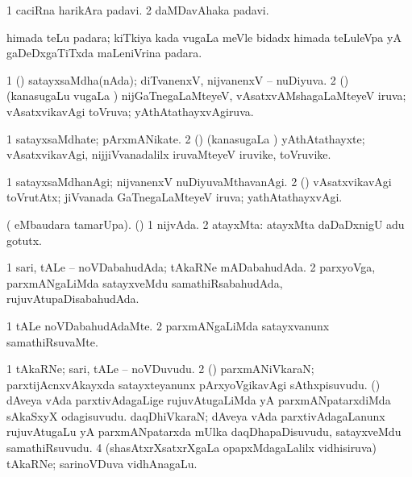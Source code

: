 {{\bentry
{} 
\gl{\nA}
\expl{}
\bmng
\bnum
\num{1} caciRna harikAra padavi. 
\num{2} daMDavAhaka padavi. 
\enum
\emng
\eentry

\bentry
{} 
\gl{\nA}
\expl{}
\bmng
 himada teLu padara; kiTkiya kada \mo vugaLa meVle bidadx himada teLuleVpa yA gaDeDxgaTiTxda maLeniVrina padara. 
\emng
\eentry

\bentry
{} 
\gl{\gu}
\expl{}
\bmng
\bnum
\num{1} (\aupa) satayxsaMdha(nAda); diTvanenxV, nijvanenxV -- nuDiyuva. 
\num{2} (\mashA) (kanasugaLu \mo vugaLa \vi) nijGaTnegaLaMteyeV, vAsatxvAMshagaLaMteyeV iruva; vAsatxvikavAgi toVruva; yAthAtathayxvAgiruva. 
\enum
\emng
\eentry

\bentry
{} 
\gl{\nA}
\expl{}
\bmng
\bnum
\num{1} satayxsaMdhate; pArxmANikate. 
\num{2} (\mashA) (kanasugaLa \vi) yAthAtathayxte; vAsatxvikavAgi, nijjiVvanadalilx iruvaMteyeV iruvike, toVruvike. 
\enum
\emng
\eentry

\bentry
{} 
\gl{\kirxvi}
\expl{}
\bmng
\bnum
\num{1} satayxsaMdhanAgi; nijvanenxV nuDiyuvaMthavanAgi. 
\num{2} (\mashA) vAsatxvikavAgi toVrutAtx; jiVvanada GaTnegaLaMteyeV iruva; yathAtathayxvAgi. 
\enum
\emng
\eentry

\bentry
{} 
\gl{\gu}
\expl{}
\bmng
 ( eMbaudara tamarUpa). (\pArxparx) 
\bnum
\num{1} nijvAda. 
\num{2} atayxMta:  atayxMta daDaDxnigU adu gotutx. 
\enum
\emng
\eentry

\bentry
{} 
\gl{\gu}
\expl{}
\bmng
\bnum
\num{1} sari, tALe -- noVDabahudAda; tAkaRNe mADabahudAda. 
\num{2} parxyoVga, parxmANgaLiMda satayxveMdu samathiRsabahudAda, rujuvAtupaDisabahudAda. 
\enum
\emng
\eentry

\bentry
{} 
\gl{\kirxvi}
\expl{}
\bmng
\bnum
\num{1} tALe noVDabahudAdaMte. 
\num{2} parxmANgaLiMda satayxvanunx samathiRsuvaMte. 
\enum
\emng
\eentry

\bentry
{} 
\gl{\nA}
\expl{}
\bmng
\bnum
\num{1} tAkaRNe; sari, tALe -- noVDuvudu. 
\num{2} (\tashA) parxmANiVkaraN; parxtijAcnxvAkayxda satayxteyanunx pArxyoVgikavAgi sAthxpisuvudu. 
\banum
{} (\nAyxshA) dAveya vAda parxtivAdagaLige rujuvAtugaLiMda yA parxmANpatarxdiMda sAkaSxyX odagisuvudu. 
 daqDhiVkaraN; dAveya vAda parxtivAdagaLanunx rujuvAtugaLu yA parxmANpatarxda mUlka daqDhapaDisuvudu, satayxveMdu samathiRsuvudu. 
\eanum
\numie
\num{4} (shasAtxrXsatxrXgaLa opapxMdagaLalilx vidhisiruva) tAkaRNe; sarinoVDuva vidhAnagaLu. 
\enum
\emng
\eentry

}}
